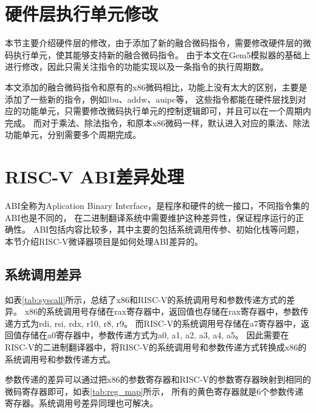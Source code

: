 \section{硬件层执行单元修改}

本节主要介绍硬件层的修改，由于添加了新的融合微码指令，需要修改硬件层的微码执行单元，使其能够支持新的融合微码指令。
由于本文在Gem5模拟器的基础上进行修改，因此只需关注指令的功能实现以及一条指令的执行周期数。

本文添加的融合微码指令和原有的x86微码相比，功能上没有太大的区别，主要是添加了一些新的指令，例如lbu、addw、auipc等，
这些指令都能在硬件层找到对应的功能单元，只需要修改微码执行单元的控制逻辑即可，并且可以在一个周期内完成。
而对于乘法、除法指令，和原本x86微码一样，默认进入对应的乘法、除法功能单元，分别需要多个周期完成。


\section{RISC-V ABI差异处理}
ABI全称为Aplication Binary Interface，是程序和硬件的统一接口，不同指令集的ABI也是不同的，
在二进制翻译系统中需要维护这种差异性，保证程序运行的正确性。
ABI包括内容比较多，其中主要的包括系统调用传参、初始化栈等问题，本节介绍RISC-V微译器项目是如何处理ABI差异的。


\subsection{系统调用差异}

如表\ref{tab:syscall}所示，总结了x86和RISC-V的系统调用号和参数传递方式的差异。
x86的系统调用号存储在rax寄存器中，返回值也存储在rax寄存器中，参数传递方式为rdi, rsi, rdx, r10, r8, r9。
而RISC-V的系统调用号存储在a7寄存器中，返回值存储在a0寄存器中，参数传递方式为a0, a1, a2, a3, a4, a5。
因此需要在RISC-V的二进制翻译器中，将RISC-V的系统调用号和参数传递方式转换成x86的系统调用号和参数传递方式。

参数传递的差异可以通过把x86的参数寄存器和RISC-V的参数寄存器映射到相同的微码寄存器即可，如表\ref{tab:reg_map}所示，
所有的黄色寄存器就是6个参数传递寄存器。系统调用号差异同理也可解决。



